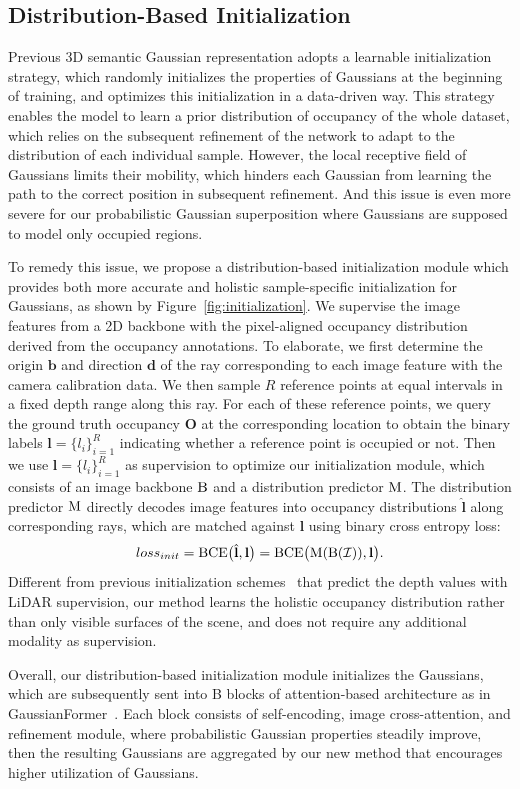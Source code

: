 \subsection{Distribution-Based Initialization}
\label{subsec: initialization}
Previous 3D semantic Gaussian representation adopts a learnable initialization strategy, which randomly initializes the properties of Gaussians at the beginning of training, and optimizes this initialization in a data-driven way.
This strategy enables the model to learn a prior distribution of occupancy of the whole dataset, which relies on the subsequent refinement of the network to adapt to the distribution of each individual sample.
However, the local receptive field of Gaussians limits their mobility, which hinders each Gaussian from learning the path to the correct position in subsequent refinement.
And this issue is even more severe for our probabilistic Gaussian superposition where Gaussians are supposed to model only occupied regions.

To remedy this issue, we propose a distribution-based initialization module which provides both more accurate and holistic sample-specific initialization for Gaussians, as shown by Figure~\ref{fig:initialization}.
We supervise the image features from a 2D backbone with the pixel-aligned occupancy distribution derived from the occupancy annotations.
To elaborate, we first determine the origin $\mathbf{b}$ and direction $\mathbf{d}$ of the ray corresponding to each image feature with the camera calibration data.
We then sample $R$ reference points at equal intervals in a fixed depth range along this ray.
For each of these reference points, we query the ground truth occupancy $\mathbf{O}$ at the corresponding location to obtain the binary labels $\mathbf{l}=\{l_i\}_{i=1}^{R}$ indicating whether a reference point is occupied or not.
Then we use $\mathbf{l}=\{l_i\}_{i=1}^{R}$ as supervision to optimize our initialization module, which consists of an image backbone ${\rm B}$ and a distribution predictor ${\rm M}$.
The distribution predictor ${\rm M}$ directly decodes image features into occupancy distributions $\hat{\mathbf{l}}$ along corresponding rays, which are matched against $\mathbf{l}$ using binary cross entropy loss:
\begin{equation}
    loss_{init} = {\rm BCE}\big(\hat{\mathbf{l}}, \mathbf{l}\big) = {\rm BCE}\big({\rm M}({\rm B}(\mathcal{I})), \mathbf{l}\big).
\end{equation}
Different from previous initialization schemes~\cite{li2023voxformer,li2022bevdepth,huang2021bevdet} that predict the depth values with LiDAR supervision, our method learns the holistic occupancy distribution rather than only visible surfaces of the scene, and does not require any additional modality as supervision.

Overall, our distribution-based initialization module initializes the Gaussians, which are subsequently sent into B blocks of attention-based architecture as in GaussianFormer~\cite{huang2024gaussian}. 
Each block consists of self-encoding, image cross-attention, and refinement module, where probabilistic Gaussian properties steadily improve, then the resulting Gaussians are aggregated by our new method that encourages higher utilization of Gaussians.
